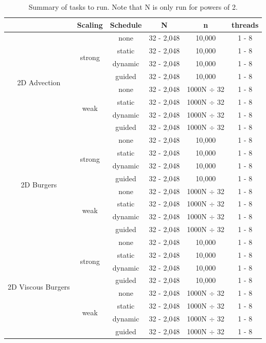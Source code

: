 \documentclass{article}
\begin{document}
\begin{table}[h]
\begin{center}
\begin{tabular}{ |c|c|c|c|c|c| } 
\hline
 & Scaling & Schedule & N & n & threads \\
\hline
\multirow{8}{4em}{2D Advection} & \multirow{4}{4em}{strong}& none & 32 - 2,048 & 10,000 & 1 - 8 \\ 
& & static & 32 - 2,048 & 10,000 & 1 - 8 \\
& & dynamic & 32 - 2,048 & 10,000 & 1 - 8 \\ 
&  & guided & 32 - 2,048 & 10,000 & 1 - 8 \\ 
& \multirow{4}{4em}{weak}& none & 32 - 2,048 & 1000N $\div$ 32 & 1 - 8 \\ 
& & static & 32 - 2,048 & 1000N $\div$ 32 & 1 - 8 \\
& & dynamic & 32 - 2,048 & 1000N $\div$ 32 & 1 - 8 \\ 
&  & guided & 32 - 2,048 & 1000N $\div$ 32 & 1 - 8 \\ 
\hline
\multirow{8}{4em}{2D Burgers} & \multirow{4}{4em}{strong}& none & 32 - 2,048 & 10,000 & 1 - 8 \\ 
& & static & 32 - 2,048 & 10,000 & 1 - 8 \\
& & dynamic & 32 - 2,048 & 10,000 & 1 - 8 \\ 
&  & guided & 32 - 2,048 & 10,000 & 1 - 8 \\ 
& \multirow{4}{4em}{weak}& none & 32 - 2,048 & 1000N $\div$ 32 & 1 - 8 \\ 
& & static & 32 - 2,048 & 1000N $\div$ 32 & 1 - 8 \\
& & dynamic & 32 - 2,048 & 1000N $\div$ 32 & 1 - 8 \\ 
&  & guided & 32 - 2,048 & 1000N $\div$ 32 & 1 - 8 \\ 
\hline
\multirow{8}{4em}{2D Viscous Burgers} & \multirow{4}{4em}{strong}& none & 32 - 2,048 & 10,000 & 1 - 8 \\ 
& & static & 32 - 2,048 & 10,000 & 1 - 8 \\
& & dynamic & 32 - 2,048 & 10,000 & 1 - 8 \\ 
&  & guided & 32 - 2,048 & 10,000 & 1 - 8 \\ 
& \multirow{4}{4em}{weak}& none & 32 - 2,048 & 1000N $\div$ 32 & 1 - 8 \\ 
& & static & 32 - 2,048 & 1000N $\div$ 32 & 1 - 8 \\
& & dynamic & 32 - 2,048 & 1000N $\div$ 32 & 1 - 8 \\ 
&  & guided & 32 - 2,048 & 1000N $\div$ 32 & 1 - 8 \\ 
\hline
\end{tabular}
\end{center}
\caption{Summary of tasks to run. Note that N is only run for powers of 2.}
\label{Table_Timing_Summary}
\end{table}
\end{document}
